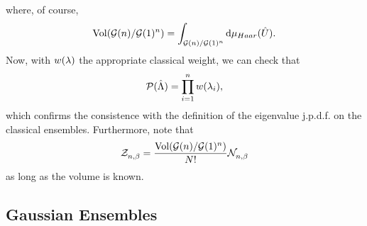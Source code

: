 where, of course,
\begin{equation}
 \operatorname{Vol}(\mathcal{G}(n)/\mathcal{G}(1)^n) = \int_{\mathcal{G}(n)/\mathcal{G}(1)^n} \mathrm{d} \mu_{Haar}(\hat U).
\end{equation}
Now, with $w(\lambda)$ the appropriate classical weight, we can check that
$$\mathcal{P}(\hat\Lambda) = \prod_{i=1}^n w(\lambda_i),$$ which confirms the consistence with the definition of the eigenvalue j.p.d.f. on the classical ensembles. Furthermore, note that
\begin{equation}
	\mathcal{Z}_{n,\beta}^{} = \frac{\operatorname{Vol}(\mathcal{G}(n)/\mathcal{G}(1)^n)}{N!} \mathcal{N}_{n,\beta}^{}
\end{equation}
as long as the volume is known.

\subsection{Gaussian Ensembles}

